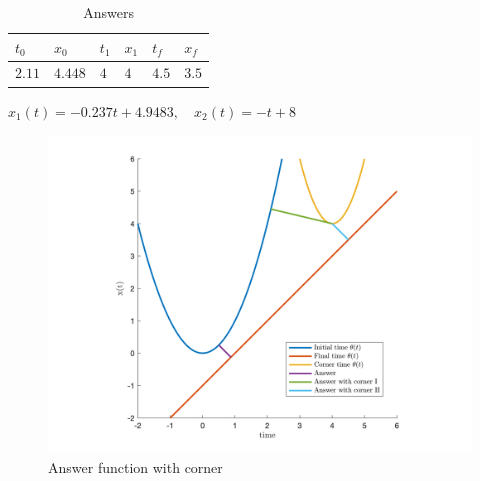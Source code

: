 \begin{table}[H]
	\caption {Answers} \label{ans} 
	\begin{center}
		\begin{tabular}{| l | l | l | l | l | l |}
			\hline
			$t_0$ & $x_0$ & $t_1$ & $x_1$ & $t_f$ & $x_f$ \TBstrut \\
			\hline
			$2.11$ & $4.448$ & $4$ & $4$ & $4.5$ & $3.5$ \Tstrut\\
			\hline
		\end{tabular}
	\end{center}
\end{table}
$x_1(t) = -0.237t+4.9483, \quad x_2(t) = -t + 8$
\begin{figure}[H]
	\caption{Answer function with corner}
	\centering
	\includegraphics[width=12cm]{Q3/figures/Q3WithCornerFixFigure.png}
\end{figure}
